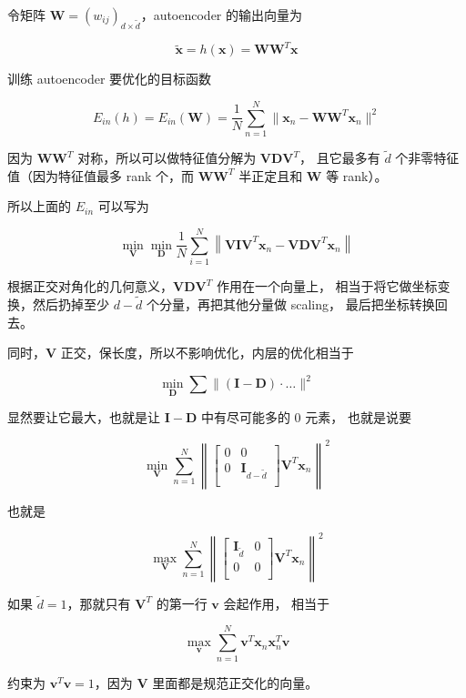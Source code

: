 \documentclass[a4paper]{article}
\begin{document}
令矩阵 $\mathbf{W} = (w_{ij})_{d \times \tilde{d}}$，autoencoder 的输出向量为

$$\tilde{\mathbf{x}} = h(\mathbf{x}) = \mathbf{WW}^{T}\mathbf{x}$$

训练 autoencoder 要优化的目标函数


$$E_{in}(h) = E_{in}(\mathbf{W}) = \frac{1}{N}\sum_{n=1}^{N}\| \mathbf{x}_n - \mathbf{WW}^{T}\mathbf{x}_n \|^2$$

因为 $\mathbf{WW}^{T}$ 对称，所以可以做特征值分解为 $\mathbf{VDV}^{T}$，
且它最多有 $\tilde{d}$ 个非零特征值（因为特征值最多 rank 个，而 $\mathbf{WW}^T$ 半正定且和 $\mathbf{W}$ 等 rank）。

所以上面的 $E_{in}$ 可以写为

$$\operatorname*{min}_{\mathbf{V}} \operatorname*{min}_{\mathbf{D}} \frac{1}{N}\sum_{i=1}^{N}\left\|\mathbf{VIV}^T\mathbf{x}_n - \mathbf{VDV}^T\mathbf{x}_n \right\|$$

根据正交对角化的几何意义，$\mathbf{VDV}^T$ 作用在一个向量上，
相当于将它做坐标变换，然后扔掉至少 $d - \tilde{d}$ 个分量，再把其他分量做 scaling，
最后把坐标转换回去。

同时，$\mathbf{V}$ 正交，保长度，所以不影响优化，内层的优化相当于

$$\operatorname*{min}_{\mathbf{D}} \sum \|(\mathbf{I-D})\cdot\dots\|^2$$

显然要让它最大，也就是让 $\mathbf{I-D}$ 中有尽可能多的 0 元素，
也就是说要

$$
\operatorname*{min}_{\mathbf{V}}\sum_{n=1}^{N}\left\|\begin{bmatrix}
0 & 0 \\
0 & \mathbf{I}_{d-\tilde{d}} \\
\end{bmatrix} \mathbf{V}^T\mathbf{x}_n\right\|^2
$$

也就是

$$
\operatorname*{max}_{\mathbf{V}}\sum_{n=1}^{N}\left\|\begin{bmatrix}
\mathbf{I}_{\tilde{d}} & 0 \\
0 & 0 \\
\end{bmatrix} \mathbf{V}^T\mathbf{x}_n\right\|^2
$$

如果 $\tilde{d}=1$，那就只有 $\mathbf{V}^T$ 的第一行 $\mathbf{v}$ 会起作用，
相当于

$$\operatorname*{max}_{\mathbf{v}}\sum_{n=1}^{N}\mathbf{v}^T\mathbf{x}_n\mathbf{x}_n^{T}\mathbf{v}$$

约束为 $\mathbf{v}^T\mathbf{v}=1$，因为 $\mathbf{V}$ 里面都是规范正交化的向量。
\end{document}
